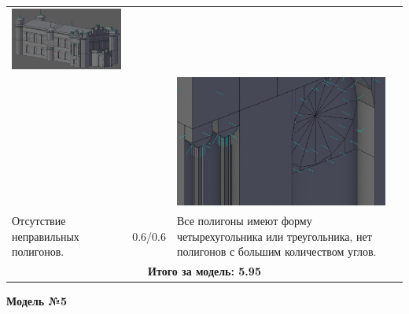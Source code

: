 \begin{longtable}{|p{4cm}|p{2.5cm}|p{7.5cm}|}
    \includegraphics[width=7cm]{src/norm_7}\\
    & & \includegraphics[width=7cm]{src/norm_8} \\
    \hline
    Отсутствие неправильных полигонов. & 0.6/0.6 & Все полигоны имеют форму четырехугольника или треугольника, нет полигонов с большим количеством углов. \\
    \hline 
    \multicolumn{3}{|c|}{\textbf{Итого за модель: 5.95}} \\
    \hline
\end{longtable}

\begin{center}
    \textbf{Модель №5}
\end{center}

